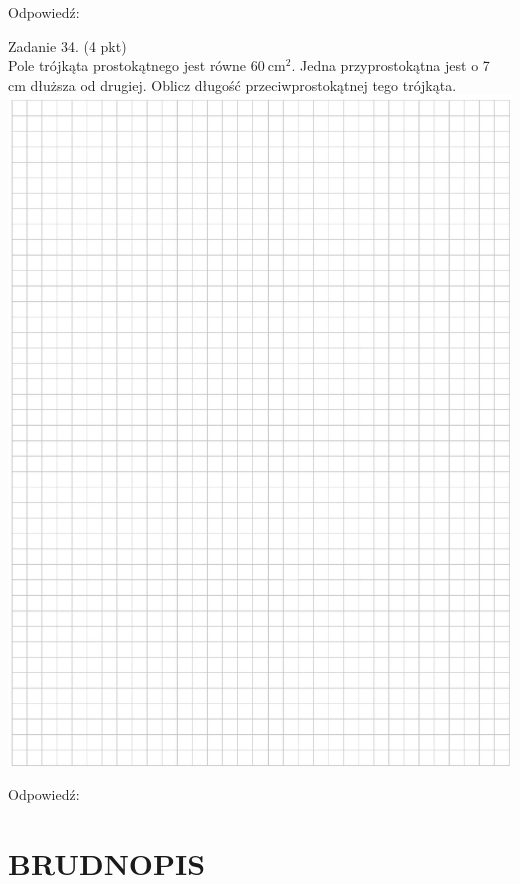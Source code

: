 \documentclass[10pt]{article}
\begin{document}
Odpowiedź:

Zadanie 34. (4 pkt)\\
Pole trójkąta prostokątnego jest równe \(60 \mathrm{~cm}^{2}\). Jedna przyprostokątna jest o 7 cm dłuższa od drugiej. Oblicz długość przeciwprostokątnej tego trójkąta.\\
\includegraphics[max width=\textwidth, center]{2024_11_21_ad52a81220b9b2239458g-16}

Odpowiedź: \(\qquad\)

\section*{BRUDNOPIS}
\end{document}
